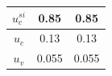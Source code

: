 \begin{table}[htbp]
\begin{tabular}{c|c|c|c|c|c|c}
$u_c^{si}$         & \multicolumn{5}{c|}{0.85} & 0.85 \\ \hline
$u_c$              & \multicolumn{5}{c|}{0.13} & 0.13 \\ \hline
$u_v$              & \multicolumn{5}{c|}{0.055} & 0.055 \\
\hline\hline
\end{tabular}
\label{table: single_spiral_para}
\end{table}